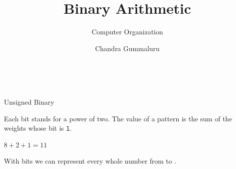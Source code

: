 \documentclass[mathserif, handout]{beamer}
\title{Binary Arithmetic}
\subtitle{Computer Organization}
\author[C. Gummaluru]{Chandra Gummaluru}
\institute[]{\url{chandra-gummaluru.github.io} }
\date[Computer Organization]{}
\newcommand{\ttab}[1]{\texttt{#1}}
\newcommand{\bitcell}[3]{%
  \node[draw, thick, minimum size=8mm, inner sep=0pt] at (#1,0) {\ttab{#2}};
  \node[smallgraytext] at (#1,-0.75) {$#3$};
}
\begin{document}
\begin{frame}
  \maketitle
\end{frame}

\begin{frame}
  \begin{center}
     \\[2mm]
  \end{center}
\end{frame}

\begin{frame}{Unsigned Binary}
  \begin{center}
    \Large {}
  \end{center}
\end{frame}

\begin{frame}
  Each bit stands for a power of two. The value of a pattern is the sum of the weights whose bit is \ttab{1}.\\[6mm]
  \begin{figure}
    \centering
  \end{figure}
  \vspace{2mm}
  \begin{center}
    $8 + 2 + 1 = 11$
  \end{center}
With  bits we can represent every whole number from  to .
\end{frame}
\end{document}
